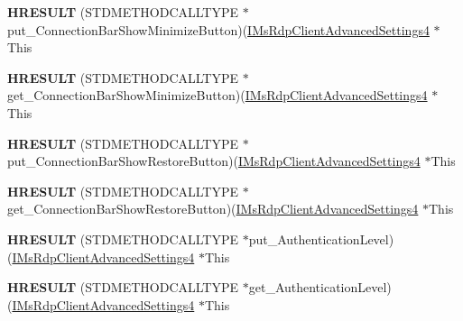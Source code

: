 \begin{DoxyCompactItemize}
{\bfseries H\+R\+E\+S\+U\+LT} (S\+T\+D\+M\+E\+T\+H\+O\+D\+C\+A\+L\+L\+T\+Y\+PE $\ast$put\+\_\+\+Connection\+Bar\+Show\+Minimize\+Button)(\hyperlink{interface_m_s_t_s_c_lib_1_1_i_ms_rdp_client_advanced_settings4}{I\+Ms\+Rdp\+Client\+Advanced\+Settings4} $\ast$This
\item 
\mbox{\label{struct_m_s_t_s_c_lib_1_1_i_ms_rdp_client_advanced_settings4_vtbl_ad9c2ea1c1d3fc305cec5ea5a6ccccbb4}} 
{\bfseries H\+R\+E\+S\+U\+LT} (S\+T\+D\+M\+E\+T\+H\+O\+D\+C\+A\+L\+L\+T\+Y\+PE $\ast$get\+\_\+\+Connection\+Bar\+Show\+Minimize\+Button)(\hyperlink{interface_m_s_t_s_c_lib_1_1_i_ms_rdp_client_advanced_settings4}{I\+Ms\+Rdp\+Client\+Advanced\+Settings4} $\ast$This
\item 
\mbox{\label{struct_m_s_t_s_c_lib_1_1_i_ms_rdp_client_advanced_settings4_vtbl_a579d1969b43e1e03a462ac2482bda065}} 
{\bfseries H\+R\+E\+S\+U\+LT} (S\+T\+D\+M\+E\+T\+H\+O\+D\+C\+A\+L\+L\+T\+Y\+PE $\ast$put\+\_\+\+Connection\+Bar\+Show\+Restore\+Button)(\hyperlink{interface_m_s_t_s_c_lib_1_1_i_ms_rdp_client_advanced_settings4}{I\+Ms\+Rdp\+Client\+Advanced\+Settings4} $\ast$This
\item 
\mbox{\label{struct_m_s_t_s_c_lib_1_1_i_ms_rdp_client_advanced_settings4_vtbl_aec8f586529826050fa08208eceb8112e}} 
{\bfseries H\+R\+E\+S\+U\+LT} (S\+T\+D\+M\+E\+T\+H\+O\+D\+C\+A\+L\+L\+T\+Y\+PE $\ast$get\+\_\+\+Connection\+Bar\+Show\+Restore\+Button)(\hyperlink{interface_m_s_t_s_c_lib_1_1_i_ms_rdp_client_advanced_settings4}{I\+Ms\+Rdp\+Client\+Advanced\+Settings4} $\ast$This
\item 
\mbox{\label{struct_m_s_t_s_c_lib_1_1_i_ms_rdp_client_advanced_settings4_vtbl_a76e932b6d35f4b96c72158c62cccfba7}} 
{\bfseries H\+R\+E\+S\+U\+LT} (S\+T\+D\+M\+E\+T\+H\+O\+D\+C\+A\+L\+L\+T\+Y\+PE $\ast$put\+\_\+\+Authentication\+Level)(\hyperlink{interface_m_s_t_s_c_lib_1_1_i_ms_rdp_client_advanced_settings4}{I\+Ms\+Rdp\+Client\+Advanced\+Settings4} $\ast$This
\item 
\mbox{\label{struct_m_s_t_s_c_lib_1_1_i_ms_rdp_client_advanced_settings4_vtbl_ad526722a19429122fa7555832295c347}} 
{\bfseries H\+R\+E\+S\+U\+LT} (S\+T\+D\+M\+E\+T\+H\+O\+D\+C\+A\+L\+L\+T\+Y\+PE $\ast$get\+\_\+\+Authentication\+Level)(\hyperlink{interface_m_s_t_s_c_lib_1_1_i_ms_rdp_client_advanced_settings4}{I\+Ms\+Rdp\+Client\+Advanced\+Settings4} $\ast$This
\end{DoxyCompactItemize}
